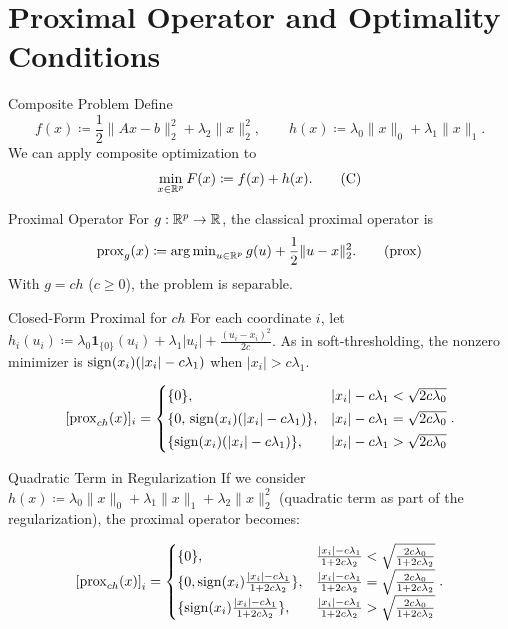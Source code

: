 \section{Proximal Operator and Optimality Conditions}

\begin{frame}{Composite Problem}
Define
\[
f(x) \coloneqq \frac{1}{2} \|Ax-b\|_2^2 + \lambda_2 \|x\|_2^2,\qquad
h(x) \coloneqq \lambda_0 \|x\|_0 + \lambda_1 \|x\|_1.
\]
We can apply composite optimization to
\[
\min_{x \in \mathbb{R}^p} F(x) \coloneqq f(x) + h(x). \tag{C}\label{C}
\]
\end{frame}

\begin{frame}{Proximal Operator}
For $g:\mathbb{R}^p \to \mathbb{R}$, the classical proximal operator is
\[
\operatorname{prox}_{g}(x) \coloneqq \operatorname{arg\,min}_{u \in \mathbb{R}^p} g(u) + \frac{1}{2}\|u-x\|_2^2. \tag{prox}\label{prox}
\]
With $g = c h$ ($c \ge 0$), the problem is separable.
\end{frame}

\begin{frame}{Closed-Form Proximal for $c h$}
For each coordinate $i$, let $h_i(u_i) \coloneqq \lambda_0 \mathbf{1}_{\{0\}}(u_i) + \lambda_1|u_i| + \frac{(u_i-x_i)^2}{2c}$.
As in soft-thresholding, the nonzero minimizer is $\operatorname{sign}(x_i)(|x_i|-c\lambda_1)$ when $|x_i| > c\lambda_1$.
\begin{footnotesize}
\[
[\operatorname{prox}_{ch}(x)]_i =
\begin{cases}
\{0\}, & |x_i|-c\lambda_1 < \sqrt{2c\lambda_0}\\[2pt]
\{0,\,\operatorname{sign}(x_i)(|x_i|-c\lambda_1)\},& |x_i|-c\lambda_1 = \sqrt{2c\lambda_0}\\[2pt]
\{\operatorname{sign}(x_i)(|x_i|-c\lambda_1)\},& |x_i|-c\lambda_1 > \sqrt{2c\lambda_0}
\end{cases}.
\]
\end{footnotesize}
\end{frame}

\begin{frame}{Quadratic Term in Regularization}
If we consider $h(x)\coloneqq \lambda_0 \|x\|_0 + \lambda_1 \|x\|_1 + \lambda_2 \|x\|_2^2$ (quadratic term as part of the regularization), the proximal operator becomes:
\begin{footnotesize}
\[\left[\operatorname{prox}_{ch}(x)\right]_i=\begin{cases}
        \{0\},& \frac{|x_i|-c\lambda_1}{1+2c\lambda_2}<\sqrt{\frac{2c\lambda_0}{1+2c\lambda_2}}\\
        \{0,\operatorname{sign}(x_i)\frac{|x_i|-c\lambda_1}{1+2c\lambda_2}\},& \frac{|x_i|-c\lambda_1}{1+2c\lambda_2}=\sqrt{\frac{2c\lambda_0}{1+2c\lambda_2}}\\
        \{\operatorname{sign}(x_i)\frac{|x_i|-c\lambda_1}{1+2c\lambda_2}\},& \frac{|x_i|-c\lambda_1}{1+2c\lambda_2}>\sqrt{\frac{2c\lambda_0}{1+2c\lambda_2}}\end{cases} .\]
\end{footnotesize}
\end{frame}

